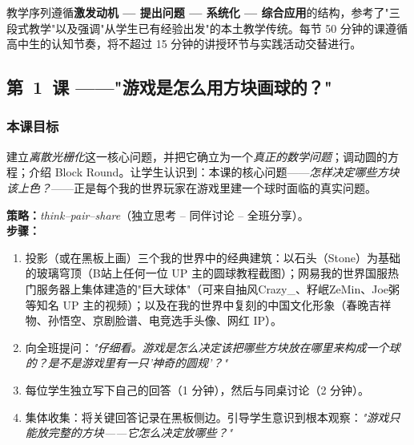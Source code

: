 \documentclass[12pt,a4paper]{scrartcl}
\newcommand{\acc}[1]{\textcolor{accent}{\textbf{#1}}}
\newcommand{\tempo}[1]{\textnormal{\footnotesize\color{bg!90!white}\textsf{#1}}}
\begin{document}
教学序列遵循\acc{激发动机 --- 提出问题 --- 系统化 --- 综合应用}的结构，参考了"三段式教学"以及强调"从学生已有经验出发"的本土教学传统。每节 50 分钟的课遵循高中生的认知节奏，将不超过 15 分钟的讲授环节与实践活动交替进行。

\subsection{第~1~课 ——"游戏是怎么用方块画球的？"}\label{aula1}

\subsubsection*{本课目标}
建立\emph{离散光栅化}这一核心问题，并把它确立为一个\emph{真正的数学问题}；调动圆的方程；介绍 Block Round。让学生认识到：本课的核心问题——\emph{怎样决定哪些方块该上色？}——正是每个我的世界玩家在游戏里建一个球时面临的真实问题。

\begin{huodong}[1.1 —— 激发动机 \quad\tempo{10 分钟}]
\textbf{策略：}\emph{think--pair--share}（独立思考 -- 同伴讨论 -- 全班分享）。\\[0.4em]
\textbf{步骤：}
\begin{enumerate}[leftmargin=1.5em,itemsep=0.2em,topsep=0.3em,nosep]
  \item 投影（或在黑板上画）三个我的世界中的经典建筑：以石头（Stone）为基础的玻璃穹顶（B站上任何一位 UP 主的圆球教程截图）；网易我的世界国服热门服务器上集体建造的"巨大球体"（可来自抽风Crazy\_、籽岷ZeMin、Joe粥等知名 UP 主的视频）；以及在我的世界中复刻的中国文化形象（春晚吉祥物、孙悟空、京剧脸谱、电竞选手头像、网红 IP）。
  \item 向全班提问：\emph{"仔细看。游戏是怎么决定该把哪些方块放在哪里来构成一个球的？是不是游戏里有一只'神奇的圆规'？"}
  \item 每位学生独立写下自己的回答（1 分钟），然后与同桌讨论（2 分钟）。
  \item 集体收集：将关键回答记录在黑板侧边。引导学生意识到根本观察：\emph{"游戏只能放完整的方块——它怎么决定放哪些？"}
\end{enumerate}
\end{huodong}
\end{document}
